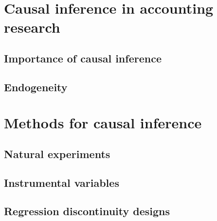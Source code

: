 \section{Causal inference in accounting research}

\subsection{Importance of causal inference}

\subsection{Endogeneity}


\section{Methods for causal inference}

\subsection{Natural experiments}

\subsection{Instrumental variables}

\subsection{Regression discontinuity designs}